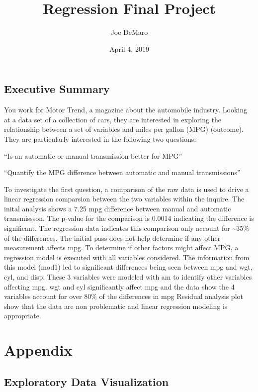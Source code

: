 \documentclass[]{article}
\title{Regression Final Project}
\author{Joe DeMaro}
\date{April 4, 2019}
\begin{document}
\maketitle

\subsection{Executive Summary}\label{executive-summary}

You work for Motor Trend, a magazine about the automobile industry.
Looking at a data set of a collection of cars, they are interested in
exploring the relationship between a set of variables and miles per
gallon (MPG) (outcome). They are particularly interested in the
following two questions:

``Is an automatic or manual transmission better for MPG''

``Quantify the MPG difference between automatic and manual
transmissions''

To investigate the first question, a comparison of the raw data is used
to drive a linear regression comparsion between the two variables within
the inquire. The inital analysis shows a 7.25 mpg difference between
manual and automatic transmissson. The p-value for the comparison is
0.0014 indicating the difference is significant. The regression data
indicates this comparison only account for \textasciitilde{}35\% of the
differences. The initial pass does not help determine if any other
measurement affects mpg. To determine if other factors might affect MPG,
a regression model is executed with all variables considered. The
information from this model (mod1) led to significant differences being
seen between mpg and wgt, cyl, and disp. These 3 variables were modeled
with am to identify other variables affecting mpg. wgt and cyl
significantly affect mpg and the data show the 4 variables account for
over 80\% of the differences in mpg Residual analysis plot show that the
data are non problematic and linear regression modeling is appropriate.

\section{Appendix}\label{appendix}

\subsection{Exploratory Data
Visualization}\label{exploratory-data-visualization}
\end{document}
